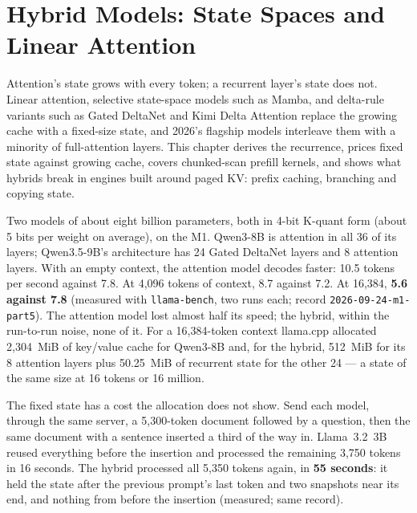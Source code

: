 \chapter{Hybrid Models: State Spaces and Linear Attention}\label{ch:hybrid-models}

\begin{ChapterIntent}
Attention's state grows with every token; a recurrent layer's state does
not. Linear attention, selective state-space models such as Mamba, and
delta-rule variants such as Gated DeltaNet and Kimi Delta Attention replace
the growing cache with a fixed-size state, and 2026's flagship models
interleave them with a minority of full-attention layers. This chapter derives
the recurrence, prices fixed state against growing cache, covers chunked-scan
prefill kernels, and shows what hybrids break in engines built around paged
KV: prefix caching, branching and copying state.
\end{ChapterIntent}


Two models of about eight billion parameters, both in 4-bit K-quant form
(about 5 bits per weight on average), on the M1. Qwen3-8B is attention in all 36 of its layers;
Qwen3.5-9B's architecture has 24 Gated DeltaNet layers and 8 attention layers.
With an empty context, the attention model decodes faster: 10.5 tokens per
second against 7.8. At 4,096 tokens of context, 8.7 against 7.2. At 16,384,
\textbf{5.6 against 7.8} (measured with \texttt{llama-bench}, two runs each;
record \texttt{2026-09-24-m1-part5}). The attention model lost almost half its
speed; the hybrid, within the run-to-run noise, none of it. For a 16,384-token
context llama.cpp allocated 2,304~MiB of key/value cache for Qwen3-8B and, for
the hybrid, 512~MiB for its 8 attention layers plus 50.25~MiB of recurrent state
for the other 24 --- a state of the same size at 16 tokens or 16 million.

The fixed state has a cost the allocation does not show. Send each model,
through the same server, a 5,300-token document followed by a question, then
the same document with a sentence inserted a third of the way in. Llama~3.2~3B
reused everything before the insertion and processed the remaining 3,750
tokens in 16 seconds. The hybrid processed all 5,350 tokens again, in
\textbf{55 seconds}: it held the state after the previous prompt's last token
and two snapshots near its end, and nothing from before the insertion
(measured; same record).

